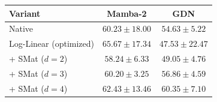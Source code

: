\begin{tabular}{lcc}
\toprule
Variant & Mamba-2 & GDN \\
\midrule
Native & $60.23 \pm 18.00$ & $54.63 \pm 5.22$ \\
Log-Linear (optimized) & $65.67 \pm 17.34$ & $47.53 \pm 22.47$ \\
+ SMat ($d=2$) & $58.24 \pm 6.33$ & $49.05 \pm 4.76$ \\
+ SMat ($d=3$) & $60.20 \pm 3.25$ & $56.86 \pm 4.59$ \\
+ SMat ($d=4$) & $62.43 \pm 13.46$ & $60.35 \pm 7.10$ \\
\bottomrule
\end{tabular}
